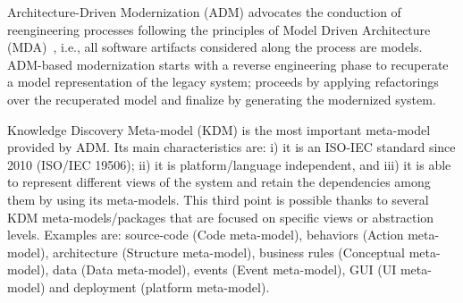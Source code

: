 





Architecture-Driven Modernization (ADM) advocates the conduction of reengineering processes following the principles of Model Driven Architecture (MDA)~\cite{1686216, Heckel2008, 7051941, IRIDurelliCatalogo}, i.e., all software artifacts considered along the process are models. ADM-based modernization starts with a reverse engineering phase to recuperate a model representation of the legacy system; proceeds by applying refactorings over the recuperated model and finalize by generating the modernized system.

Knowledge Discovery Meta-model (KDM) is the most important meta-model provided by ADM. Its main characteristics are: i) it is an ISO-IEC standard since 2010 (ISO/IEC 19506); ii) it is platform/language independent, and iii) it is able to represent different views of the system and retain the dependencies among them by using its meta-models. This third point is possible thanks to several KDM meta-models/packages that are focused on specific views or abstraction levels. Examples are:  source-code (Code meta-model), behaviors (Action meta-model), architecture (Structure meta-model), business rules (Conceptual meta-model), data (Data meta-model), events (Event meta-model), GUI (UI meta-model) and deployment (platform meta-model).  

